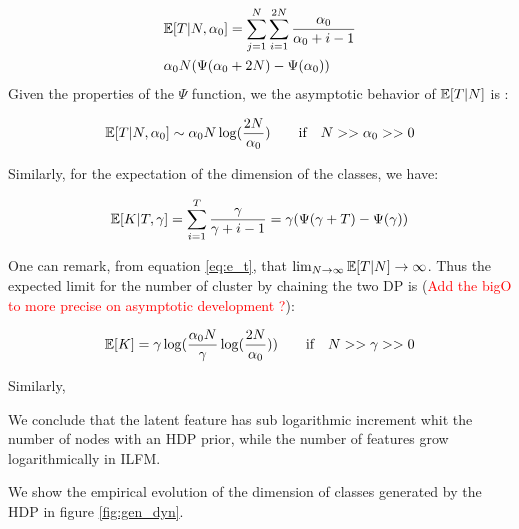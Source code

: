 \begin{align}
&\mathbb{E}[T|N, \alpha_0] = \sum_{j=1}^N\sum_{i=1}^{2N} \frac{\alpha_0}{\alpha_0 +i-1} \\
& \alpha_0 N (\Psi(\alpha_0+2N) - \Psi(\alpha_0))
\end{align}
Given the properties of the $\Psi$ function, we the asymptotic behavior of $\mathbb{E}[T|N]$ is :

\begin{equation*} \label{eq:e_t}
\E[T|N, \alpha_0] \sim \alpha_0 N \log(\frac{2N}{\alpha_0}) \qquad \text{if} \quad N >> \alpha_0 >> 0
\end{equation*}

Similarly, for the expectation of the dimension of the classes, we have:

\begin{equation*}
\mathbb{E}[K|T, \gamma] = \sum_{i=1}^{T} \frac{\gamma}{\gamma +i-1} = \gamma (\Psi(\gamma+T) - \Psi(\gamma))
\end{equation*}

One can remark, from equation \eqref{eq:e_t}, that $\lim_{N\to\infty} \mathbb{E}[T|N] \to  \infty$. Thus the expected limit for the number of cluster by chaining the two DP is (\textcolor{red}{Add the bigO to more precise on asymptotic development ?}):

\begin{equation*}
\mathbb{E}[K] = \gamma \log(\frac{\alpha_0 N}{\gamma}\log(\frac{2N}{\alpha_0} )) \qquad \textnormal{if} \quad N >> \gamma>>0
\end{equation*}

Similarly, 

We conclude that the latent feature has sub logarithmic increment whit the number of nodes with an HDP prior, while the number of features grow logarithmically in ILFM.

We show the empirical evolution of the dimension of classes generated by the HDP in figure \ref{fig:gen_dyn}.


